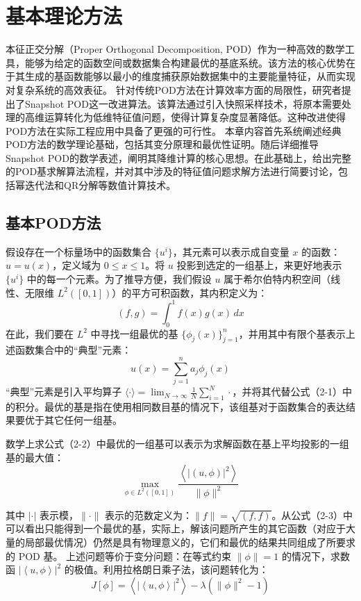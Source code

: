                 \chapter{基本理论方法}

\label{cha:sysu-thesis-contents-format-requirement}
本征正交分解（Proper Orthogonal Decomposition, POD）作为一种高效的数学工具，能够为给定的函数空间或数据集合构建最优的基底系统。该方法的核心优势在于其生成的基函数能够以最小的维度捕获原始数据集中的主要能量特征，从而实现对复杂系统的高效表征。
针对传统POD方法在计算效率方面的局限性，研究者提出了Snapshot POD这一改进算法。该算法通过引入快照采样技术，将原本需要处理的高维运算转化为低维特征值问题，使得计算复杂度显著降低。这种改进使得POD方法在实际工程应用中具备了更强的可行性。
本章内容首先系统阐述经典POD方法的数学理论基础，包括其变分原理和最优性证明。随后详细推导Snapshot POD的数学表述，阐明其降维计算的核心思想。在此基础上，给出完整的POD基求解算法流程，并对其中涉及的特征值问题求解方法进行简要讨论，包括幂迭代法和QR分解等数值计算技术。
\section{基本POD方法}
假设存在一个标量场中的函数集合 \(\{u^i\}\)，其元素可以表示成自变量 \(x\) 的函数：\(u = u(x)\)，定义域为 \(0 \leq x \leq 1\)。将 \(u\) 投影到选定的一组基上，来更好地表示 \(\{u^i\}\) 中的每一个元素。为了推导方便，我们假设 \(u\) 属于希尔伯特内积空间（线性、无限维 \(L^2([0,1])\)）的平方可积函数，其内积定义为：
\begin{equation}
(f, g) = \int_0^1 f(x)g(x) \, dx \tag{2-1}
\end{equation}
在此，我们要在 \(L^2\) 中寻找一组最优的基 \(\{\phi_j(x)\}_{j=1}^n\)，并用其中有限个基表示上述函数集合中的“典型”元素：
\begin{equation}
u(x) = \sum_{j=1}^n a_j \phi_j(x) \tag{2-2}
\end{equation}
“典型”元素是引入平均算子 \(\langle \cdot \rangle = \lim_{N \to \infty} \frac{1}{N} \sum_{i=1}^N \cdot\)，并将其代替公式（2-1）中的积分。最优的基是指在使用相同数目基的情况下，该组基对于函数集合的表达结果要优于其它任何一组基。

数学上求公式（2-2）中最优的一组基可以表示为求解函数在基上平均投影的一组基的最大值：
\begin{equation}
\max_{\phi \in L^2([0,1])} \frac{\left\langle |(u, \phi)|^2 \right\rangle}{\|\phi\|^2} \tag{2-3}
\end{equation}

其中 \(|\cdot|\) 表示模，\(\|\cdot\|\) 表示的范数定义为：\(\|f\| = \sqrt{(f, f)}\)。从公式（2-3）中可以看出只能得到一个最优的基，实际上，解该问题所产生的其它函数（对应于大量的局部最优情况）仍然是具有物理意义的，它们和最优的结果共同组成了所要求的 POD 基。
上述问题等价于变分问题：在等式约束 \(\|\phi\| = 1\) 的情况下，求数函 \(\left|\left\langle u, \phi \right\rangle\right|^2\) 的极值。利用拉格朗日乘子法，该问题转化为：
\begin{equation}
J[\phi] = \left\langle \left| \left\langle u, \phi \right\rangle \right|^2 \right\rangle - \lambda \left( \|\phi\|^2 - 1 \right) \tag{2-4}
\end{equation}


